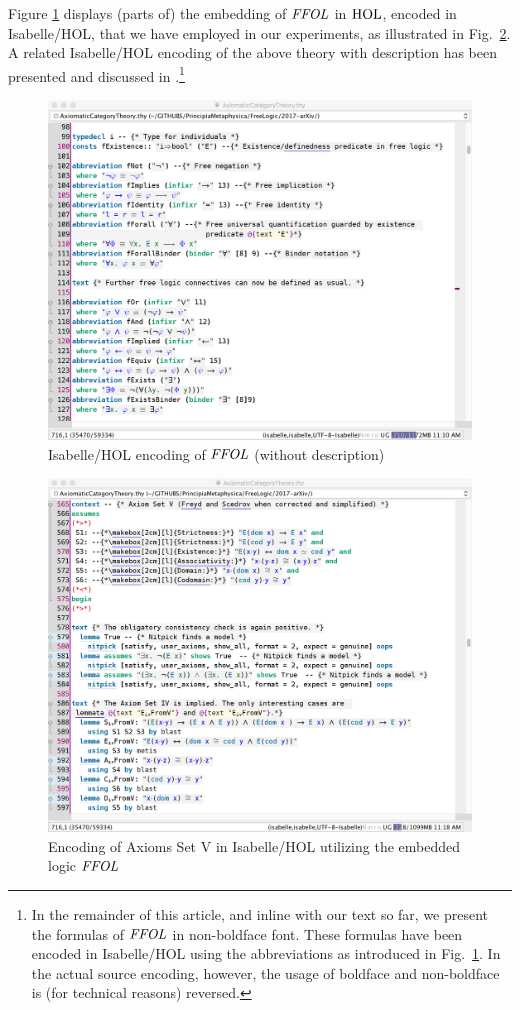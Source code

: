 Figure \ref{pic1} displays (parts of) the embedding of $\mathit{FFOL}$ in
$\text{\textrm{HOL}}$, encoded in Isabelle/HOL, that we have employed in our
experiments, as illustrated in Fig.~\ref{pic2}. A related Isabelle/HOL encoding of the above theory with
description has been presented and discussed in
\cite{ICMS}.\footnote{In the remainder of this article, and inline
  with our text so far,  we present the formulas of
  $\mathit{FFOL}$ in non-boldface font. These formulas have been encoded in Isabelle/HOL using the
  abbreviations as introduced in Fig.~\ref{pic1}. In the actual source
  encoding, however, the usage of boldface and non-boldface is
  (for technical reasons) reversed.}

\begin{figure}[htp]
 \includegraphics[width=\textwidth]{FFOL-Pic1}
 \caption{Isabelle/HOL encoding of $\mathit{FFOL}$ (without description)\label{pic1}}
\end{figure}

\begin{figure}[htp]
 \includegraphics[width=\textwidth]{FFOL-Pic2}
 \caption{Encoding of Axioms Set V in Isabelle/HOL utilizing the
   embedded logic $\mathit{FFOL}$ \label{pic2}}
\end{figure}




